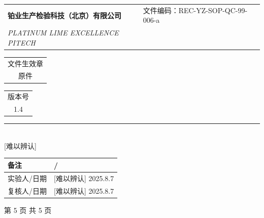 \documentclass[UTF8,10pt,a4paper,fontset=fandol]{ctexart}
\newcommand{\fieldvalue}[1]{#1}
\newcommand{\handwritten}[1]{#1}
\begin{document}

\newpage

\noindent
\begin{minipage}{\textwidth}
\small
\begin{tabular}{@{}p{}p{}p{}@{}}
\textbf{铂业生产检验科技（北京）有限公司} &
文件编码：REC-YZ-SOP-QC-99-006-a &
\\[-2pt]
\textit{PLATINUM LIME EXCELLENCE PITECH} &
&
\\
\end{tabular}

\vspace{-0.2cm}
\hfill
\begin{tabular}{|c|}
\hline
文件生效章\\
\fieldvalue{原件}\\
\hline
\end{tabular}
\hspace{0.3cm}
\begin{tabular}{|c|}
\hline
版本号\\
\fieldvalue{1.4}\\
\hline
\end{tabular}

\vspace{0.1cm}
\noindent\rule{\textwidth}{0.5pt}

\vspace{15.5cm}
\begin{center}
\fbox{\rule{0pt}{3.2cm}\rule{0.36\textwidth}{0pt}}\\[-2pt]
\handwritten{[难以辨认]}
\end{center}

\vfill

\begin{tabularx}{\textwidth}{|p{}|X|}
\hline
备注 &
\fieldvalue{\handwritten{/}}\\
\hline
实验人/日期 &
\fieldvalue{\handwritten{[难以辨认]}}\quad
\fieldvalue{\handwritten{2025.8.7}}\\
\hline
复核人/日期 &
\fieldvalue{\handwritten{[难以辨认]}}\quad
\fieldvalue{\handwritten{2025.8.7}}\\
\hline
\end{tabularx}

\begin{center}
\scriptsize 第 5 页 共 5 页
\end{center}
\end{minipage}
\end{document}
